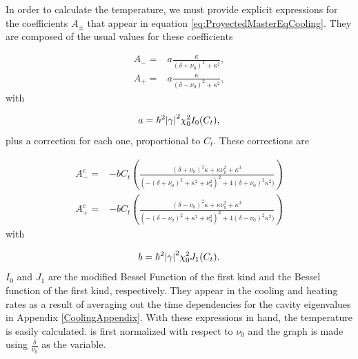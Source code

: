 \documentclass[reprint, amsmath,amssymb, aps,pra]{revtex4-1}
\begin{document}
In order to calculate the temperature, we must provide explicit expressions for the coefficients $A_\pm$ that appear in equation \eqref{eq:ProyectedMasterEqCooling}.  They are composed of the usual values for these coefficients\citep{LCNooshi}

\begin{align}
A_- =& a\frac{\kappa}{(\delta+\nu_0)^2+\kappa^2},\\
A_+ =& a\frac{\kappa}{(\delta-\nu_0)^2+\kappa^2},
\end{align} with 

\begin{equation}
a = \hbar^2\abs{\gamma}^2\chi_0^2 I_0(C_t),
\end{equation} plus a correction for each one, proportional to  $C_t$. These corrections are

\begin{align}
A_-^c=& -bC_t(\frac{(\delta+\nu_0)^2\kappa+ \kappa\nu_0^2 + \kappa^3}{(-(\delta+\nu_0)^2+\kappa^2+\nu_0^2)^2+4(\delta+\nu_0)^2\kappa^2)})\\
A_+^c=& -bC_t(\frac{(\delta-\nu_0)^2\kappa+ \kappa\nu_0^2 + \kappa^3}{(-(\delta-\nu_0)^2+\kappa^2+\nu_0^2)^2+4(\delta-\nu_0)^2\kappa^2)})
\end{align} with

\begin{equation}
b= \hbar^2\abs{\gamma}^2\chi_0^2 J_1(C_t).
\end{equation}
$I_0$ and $J_1$ are the modified Bessel Function of the first kind and
the Bessel function of the first kind, respectively. They appear in
the cooling and heating rates as a result of averaging out the time
dependencies for the cavity eigenvalues in Appendix
\ref{CoolingAppendix}.
With these expressions in hand, the temperature is easily calculated.
 is first normalized with respect to $\nu_0$ and the graph
is made using $\frac{\delta}{\nu_0}$ as the variable.
\end{document}
